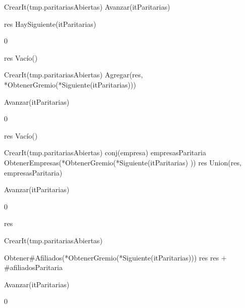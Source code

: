 {
	\state {} \asig CrearIt(tmp.paritariasAbiertas)		
			
		\state
		\state Avanzar(itParitarias)				
	\endwhile
	\state

	\state res \asig HaySiguiente(itParitarias)		
}
{0}

{
	\state res \asig Vacío()		
	\state

	\state {} \asig CrearIt(tmp.paritariasAbiertas)		
											
		\state
		\state Agregar(res, *ObtenerGremio(*Siguiente(itParitarias)))		
		
		\state
		\state Avanzar(itParitarias)										
	\endwhile
}
{0}

{
	\state res \asig Vacío()		
	\state

	\state {} \asig CrearIt(tmp.paritariasAbiertas)		
							
		\state
		\state conj(empresa) empresasParitaria \asig ObtenerEmpresas(*ObtenerGremio(*Siguiente(itParitarias)		))
		\state res \asig Union(res, empresasParitaria)		

		\state
		\state Avanzar(itParitarias)						
	\endwhile
}
{0}

{
	\state res 		
	\state

	\state {} \asig CrearIt(tmp.paritariasAbiertas)		
						
		\state

		\state {} \asig Obtener\#Afiliados(*ObtenerGremio(*Siguiente(itParitarias)))		
		\state res \asig res + \#afiliadosParitaria		

		\state
		\state Avanzar(itParitarias)					
	\endwhile
}
{0}

